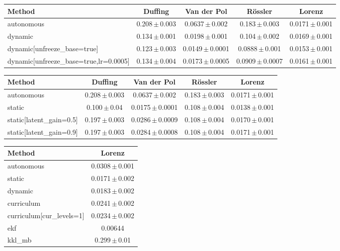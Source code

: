 \begin{tabular}{lcccc}
\toprule
Method & Duffing & Van der Pol & R\"ossler & Lorenz \\
\midrule
autonomous & 0.208\,$\pm$\,0.003 & 0.0637\,$\pm$\,0.002 & 0.183\,$\pm$\,0.003 & 0.0171\,$\pm$\,0.001 \\
dynamic & 0.134\,$\pm$\,0.001 & 0.0198\,$\pm$\,0.001 & 0.104\,$\pm$\,0.002 & 0.0169\,$\pm$\,0.001 \\
dynamic[unfreeze\_base=true] & 0.123\,$\pm$\,0.003 & 0.0149\,$\pm$\,0.0001 & 0.0888\,$\pm$\,0.001 & 0.0153\,$\pm$\,0.001 \\
dynamic[unfreeze\_base=true,lr=0.0005] & 0.134\,$\pm$\,0.004 & 0.0173\,$\pm$\,0.0005 & 0.0909\,$\pm$\,0.0007 & 0.0161\,$\pm$\,0.001 \\
\bottomrule
\end{tabular}

\begin{tabular}{lcccc}
\toprule
Method & Duffing & Van der Pol & R\"ossler & Lorenz \\
\midrule
autonomous & 0.208\,$\pm$\,0.003 & 0.0637\,$\pm$\,0.002 & 0.183\,$\pm$\,0.003 & 0.0171\,$\pm$\,0.001 \\
static & 0.100\,$\pm$\,0.04 & 0.0175\,$\pm$\,0.0001 & 0.108\,$\pm$\,0.004 & 0.0138\,$\pm$\,0.001 \\
static[latent\_gain=0.5] & 0.197\,$\pm$\,0.003 & 0.0286\,$\pm$\,0.0009 & 0.108\,$\pm$\,0.004 & 0.0170\,$\pm$\,0.001 \\
static[latent\_gain=0.9] & 0.197\,$\pm$\,0.003 & 0.0284\,$\pm$\,0.0008 & 0.108\,$\pm$\,0.004 & 0.0171\,$\pm$\,0.001 \\
\bottomrule
\end{tabular}

\begin{tabular}{lc}
\toprule
Method & Lorenz \\
\midrule
autonomous & 0.0308\,$\pm$\,0.001 \\
static & 0.0171\,$\pm$\,0.002 \\
dynamic & 0.0183\,$\pm$\,0.002 \\
curriculum & 0.0241\,$\pm$\,0.002 \\
curriculum[cur\_levels=1] & 0.0234\,$\pm$\,0.002 \\
ekf & 0.00644 \\
kkl\_mb & 0.299\,$\pm$\,0.01 \\
\bottomrule
\end{tabular}

